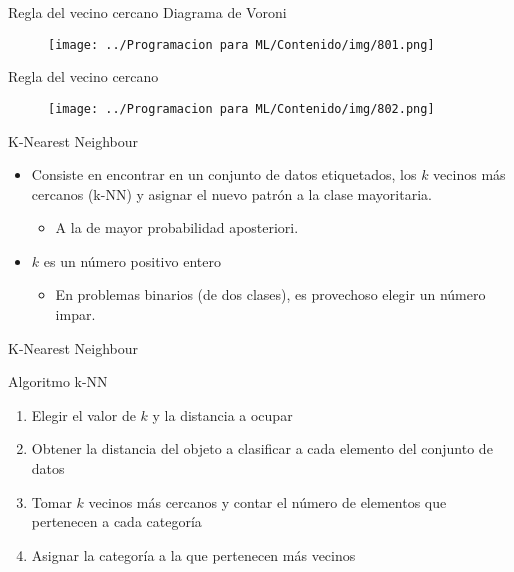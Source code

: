 \documentclass[11pt,aspectratio=169]{beamer}
\begin{document}
\begin{frame}{Regla del vecino cercano}
Diagrama de Voroni
\begin{figure}[H]
	\centering
	\texttt{[image: ../Programacion para ML/Contenido/img/801.png]}
\end{figure}
\end{frame}

\begin{frame}{Regla del vecino cercano}
\begin{figure}[H]
	\centering
	\texttt{[image: ../Programacion para ML/Contenido/img/802.png]}
\end{figure}
\end{frame}

\begin{frame}{K-Nearest Neighbour}
\begin{itemize}
	\item Consiste en encontrar en un conjunto de datos etiquetados, los $k$ vecinos más cercanos (k-NN) y asignar el nuevo 
	patrón a la clase mayoritaria.\pause
		\begin{itemize}
			\item A la de mayor probabilidad aposteriori.\pause
		\end{itemize}		
	\item $k$ es un número positivo entero\pause
		\begin{itemize}
			\item En problemas binarios (de dos clases), es provechoso elegir un número impar.
		\end{itemize}
\end{itemize}
\end{frame}

\begin{frame}{K-Nearest Neighbour}
\begin{block}{Algoritmo k-NN}\pause
\begin{enumerate}
	\item Elegir el valor de $k$ y la distancia a ocupar\pause
	\item Obtener la distancia del objeto a clasificar a cada elemento del conjunto de datos\pause
	\item Tomar $k$ vecinos más cercanos y contar el número de elementos que pertenecen a cada categoría\pause
	\item Asignar la categoría a la que pertenecen más vecinos
\end{enumerate}
\end{block}
\end{frame}
\end{document}
